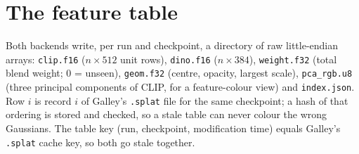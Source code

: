 \documentclass[11pt,a4paper]{article}
\newcommand{\code}[1]{\texttt{#1}}
\begin{document}
\section{The feature table}
Both backends write, per run and checkpoint, a directory of raw little-endian arrays: \code{clip.f16}
($n\times512$ unit rows), \code{dino.f16} ($n\times384$), \code{weight.f32} (total blend weight; 0 = unseen),
\code{geom.f32} (centre, opacity, largest scale), \code{pca\_rgb.u8} (three principal components of CLIP, for a
feature-colour view) and \code{index.json}. Row $i$ is record $i$ of Galley's \code{.splat} file for the same
checkpoint; a hash of that ordering is stored and checked, so a stale table can never colour the wrong Gaussians.
The table key (run, checkpoint, modification time) equals Galley's \code{.splat} cache key, so both go stale
together.

\end{document}
